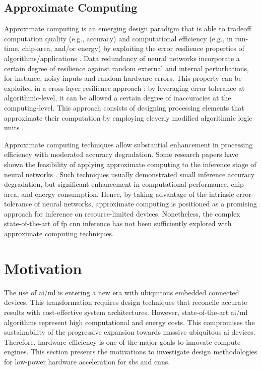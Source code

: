 \subsection{Approximate Computing}
Approximate computing is an emerging design paradigm that is able to tradeoff computation quality (e.g., accuracy) and computational efficiency (e.g., in run-time, chip-area, and/or energy) by exploiting the error resilience properties of algorithms/applications \cite{gillani2020exploiting, zhang2015approxann}. Data redundancy of neural networks incorporate a certain degree of resilience against random external and internal perturbations, for instance, noisy inputs and random hardware errors. This property can be exploited in a cross-layer resilience approach \cite{carter2010design}: by leveraging error tolerance at algorithmic-level, it can be allowed a certain degree of inaccuracies at the computing-level. This approach consists of designing processing elements that approximate their computation by employing cleverly modified algorithmic logic units \cite{han2013approximate}.

Approximate computing techniques allow substantial enhancement in processing efficiency with moderated accuracy degradation. Some research papers have shown the feasibility of applying approximate computing to the inference stage of neural networks \cite{lotrivc2012applicability, han2013approximate, du2014leveraging, mrazek2016design, sarwar2016multiplier, zervakis2021approximate}. Such techniques usually demonstrated small inference accuracy degradation, but significant enhancement in computational performance, chip-area, and energy consumption. Hence, by taking advantage of the intrinsic error-tolerance of neural networks, approximate computing is positioned as a promising approach for inference on resource-limited devices. Nonetheless, the complex state-of-the-art of \gls{fp} \gls{cnn} inference has not been sufficiently explored with approximate computing techniques.

\section{Motivation}\label{chap1.motivation}
The use of \gls{ai}/\gls{ml} is entering a new era with ubiquitous embedded connected devices. This transformation requires design techniques that reconcile accurate results with cost-effective system architectures. However, state-of-the-art \gls{ai}/\gls{ml} algorithms represent high computational and energy costs. This compromises the sustainability of the progressive expansion towards massive ubiquitous \gls{ai} devices. Therefore, hardware efficiency is one of the major goals to innovate compute engines. This section presents the motivations to investigate design methodologies for low-power hardware acceleration for \gls{sbs} and \gls{cnn}s.

